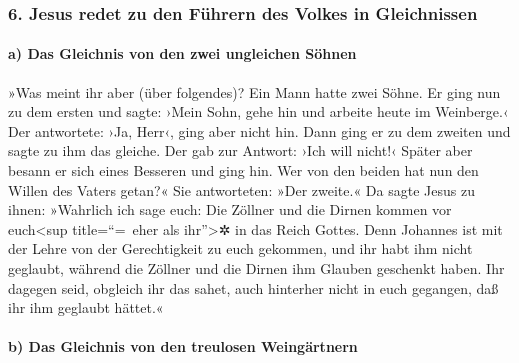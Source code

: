 \hypertarget{jesus-redet-zu-den-fuxfchrern-des-volkes-in-gleichnissen}{%
\subsubsection{6. Jesus redet zu den Führern des Volkes in
Gleichnissen}\label{jesus-redet-zu-den-fuxfchrern-des-volkes-in-gleichnissen}}

\hypertarget{a-das-gleichnis-von-den-zwei-ungleichen-suxf6hnen}{%
\paragraph{a) Das Gleichnis von den zwei ungleichen
Söhnen}\label{a-das-gleichnis-von-den-zwei-ungleichen-suxf6hnen}}

 »Was meint ihr aber (über folgendes)? Ein Mann hatte
zwei Söhne. Er ging nun zu dem ersten und sagte: ›Mein Sohn, gehe hin
und arbeite heute im Weinberge.‹  Der antwortete: ›Ja,
Herr‹, ging aber nicht hin.  Dann ging er zu dem zweiten
und sagte zu ihm das gleiche. Der gab zur Antwort: ›Ich will nicht!‹
Später aber besann er sich eines Besseren und ging hin. 
Wer von den beiden hat nun den Willen des Vaters getan?« Sie
antworteten: »Der zweite.« Da sagte Jesus zu ihnen: »Wahrlich ich sage
euch: Die Zöllner und die Dirnen kommen vor euch\textless sup
title=``=~eher als ihr''\textgreater✲ in das Reich Gottes.
 Denn Johannes ist mit der Lehre von der Gerechtigkeit zu
euch gekommen, und ihr habt ihm nicht geglaubt, während die Zöllner und
die Dirnen ihm Glauben geschenkt haben. Ihr dagegen seid, obgleich ihr
das sahet, auch hinterher nicht in euch gegangen, daß ihr ihm geglaubt
hättet.«

\hypertarget{b-das-gleichnis-von-den-treulosen-weinguxe4rtnern}{%
\paragraph{b) Das Gleichnis von den treulosen
Weingärtnern}\label{b-das-gleichnis-von-den-treulosen-weinguxe4rtnern}}

